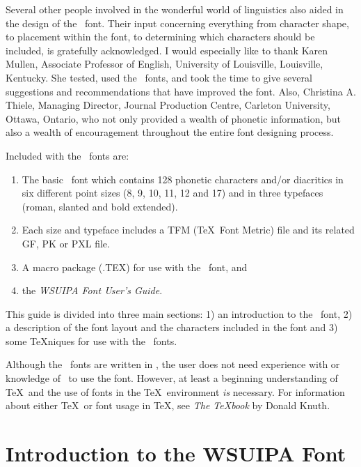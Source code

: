 Several other people involved
in the wonderful world of linguistics also aided in the design of the \wsu\
font. Their input concerning everything
from character shape, to placement within the font, to determining which
characters should be included, is gratefully acknowledged. I would especially
like to thank Karen Mullen, Associate Professor of English, University of
Louisville, Louisville, Kentucky.  She tested, used the \wsu\ fonts, and took
the time to give several suggestions and recommendations that have improved
the font. Also, Christina A. Thiele, Managing Director, Journal Production
 Centre,
Carleton University, Ottawa, Ontario, who not only provided a wealth
of phonetic information, but also a wealth of encouragement throughout
the entire font designing process.


Included with the \wsu\ fonts are:

\begin{enumerate}
\item
The basic \wsu\ font which contains 128 phonetic characters
and/or diacritics in six different point sizes (8,
9, 10, 11, 12 and 17) and in
three typefaces (roman, slanted and bold extended).

\item Each size and typeface includes a TFM (\TeX\ Font Metric)
file and its related GF, PK or PXL file.

\item A macro package (\ipam.TEX) for use with the \wsu\ font, and

\item the {\it WSUIPA Font User's Guide}.
\end{enumerate}

This guide is divided into three main sections: 1) an introduction to the \wsu\
font,
2) a description of the font layout and the characters included in the font
and 3) some \TeX niques for use with the \wsu\  fonts.

Although the \wsu\ fonts are written in \meta , the user does not need
experience with or knowledge of \meta\ to use the font. However, at least a
beginning understanding of \TeX\ and the use of fonts in the \TeX\ environment
{\it is} necessary. For information about either \TeX\ or font usage in \TeX ,
see {\it The \TeX book} by Donald Knuth.

\section{Introduction to the WSUIPA Font}


